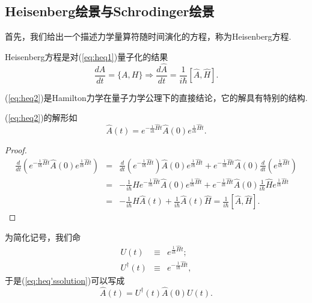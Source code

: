 		\subsection{Heisenberg绘景与Schrodinger绘景}
			首先，我们给出一个描述力学量算符随时间演化的方程，称为Heisenberg方程.
			\begin{definition}Heisenberg方程是对(\ref{eq:heq1})量子化的结果
				\begin{equation}\label{eq:heq2}
					\frac{dA}{dt}=\{A,H\}\Rightarrow\frac{d\hat{A}}{dt}=\frac{1}{i\hbar}[\hat{A},\hat{H}].
				\end{equation}
			\end{definition}
			(\ref{eq:heq2})是Hamilton力学在量子力学公理下的直接结论，它的解具有特别的结构.
			\begin{lemma}
				(\ref{eq:heq2})的解形如
				\begin{equation}\label{eq:heq'ssolution}
					\hat{A}(t)=e^{-\frac{1}{i\hbar}\hat{H}t}\hat{A}(0)e^{\frac{1}{i\hbar}\hat{H}t}.
				\end{equation}
				
			\end{lemma}
			\begin{proof}
				\begin{eqnarray*}
					\frac{d}{d t}\left(e^{-\frac{1}{i \hbar} \hat{H} t} \hat{A}(0) e^{\frac{1}{i \hbar} \hat{H} t}\right)&=&\frac{d}{d t}\left(e^{-\frac{1}{i \hbar}\hat{H} t}\right)\hat{A}(0) e^{\frac{1}{i \hbar} \hat{H} t}+e^{-\frac{1}{i \hbar} \hat{H} t} \hat{A}(0) \frac{d}{d t}\left(e^{\frac{1}{i \hbar} \hat{H} t}\right)\\
					&=&-\frac{1}{i \hbar} \hat{H} e^{-\frac{1}{i \hbar} \hat{H} t} \hat{A}(0) e^{\frac{1}{i \hbar} \hat{H} t}+e^{-\frac{1}{i \hbar} \hat{H} t} \hat{A}(0) \frac{1}{i \hbar} \hat{H} e^{\frac{1}{i \hbar} \hat{H} t} \\
					&=&-\frac{1}{i \hbar} \hat{H} \hat{A}(t)+\frac{1}{i \hbar} \hat{A}(t) \hat{H}=\frac{1}{i \hbar}[\hat{A}, \hat{H}].
				\end{eqnarray*}
			\end{proof}
			\begin{remark}
				为简化记号，我们命
			\begin{eqnarray*}
				U(t)&\equiv&e^{\frac{1}{i \hbar} \hat{H} t};\\
				U^\dagger (t)&\equiv&e^{-\frac{1}{i \hbar} \hat{H} t},
			\end{eqnarray*}
			于是(\ref{eq:heq'ssolution})可以写成
			\begin{equation}\label{eq:heq'ssolution2}
				\hat{A}(t)=U^\dagger(t)\hat{A}(0)U(t).
			\end{equation}
			\end{remark}
			
